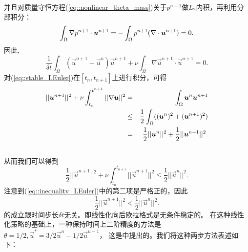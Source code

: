          并且对质量守恒方程(\ref{eq::nonlinear_theta_mass})关于$p^{n + 1}$做$L_2$内积，再利用分部积分：
         \begin{equation}
            \int_{\Omega} \nabla p^{n + 1} \cdot \vec{u}^{n + 1} = -\int_{\Omega}p^{n + 1}(\nabla \cdot \vec{u}^{n + 1}) = 0. \notag
         \end{equation}
         因此,
         \begin{equation}
            \frac{1}{\delta t}\int_{\Omega}(\vec{u}^{n + 1} - \vec{u}^n)\vec{u}^{n + 1} + \nu \int_{\Omega}\nabla \vec{u}^{n + 1} \cdot \vec{u}^{u + 1} = 0.
            \label{eq::stable_LEuler}
         \end{equation}
         对(\ref{eq::stable_LEuler})在$[t_n, t_{n + 1}]$上进行积分，可得
         \begin{eqnarray}
            ||\vec{u}^{n + 1}||^2 + \nu \int_{t_n}^{t^{n + 1}}||\nabla \vec{u}||^2
            & = & \int_{\Omega} \vec{u}^{n} \vec{u}^{n + 1} \\ \notag
            &\leq & \frac{1}{2}\int_{\Omega} ((\vec{u}^{n})^2 + (\vec{u}^{n + 1})^2) \\ \notag
            & = & \frac{1}{2}||\vec{u}^n||^2 + \frac{1}{2}||\vec{u}^{n + 1}||^2. \\ \notag
         \end{eqnarray}
         从而我们可以得到
         \begin{equation}
            \frac{1}{2}||\vec{u}^{n + 1}||^2 + \nu \int_{t_n}^{t_{n + 1}}||\vec{u}^{n + 1}||^2 \leq \frac{1}{2}||\vec{u}^{n}||^2.
            \label{eq::inequality_LEuler}
         \end{equation}
         注意到(\ref{eq::inequality_LEuler})中的第二项是严格正的，因此
         \begin{equation}
            \frac{1}{2} ||\vec{u}^{n + 1}||^2 < \frac{1}{2} ||\vec{u}^{n}||^2.
         \end{equation}
         的成立跟时间步长$\delta t$无关。即线性化向后欧拉格式是无条件稳定的。
         在这种线性化策略的基础上，一种保持时间上二阶精度的方法是$\theta = 1/2, \vec{u}^* = {3/2\vec{u}^n - 1/2\vec{u}^{n - 1}}$，
         这是\cite{simo1994unconditional}中提出的。我们将这种两步方法表述如下：
